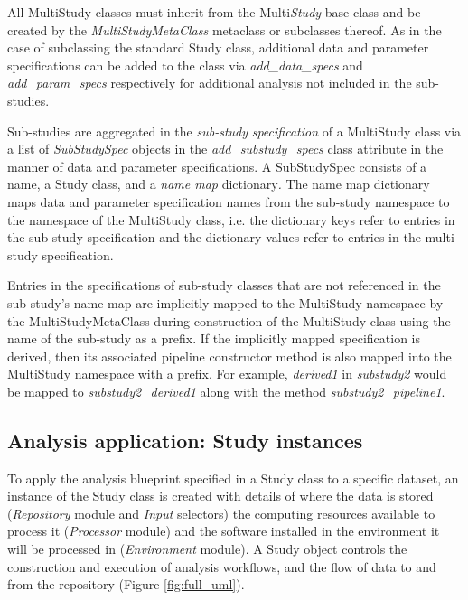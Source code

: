 \documentclass[smallextended]{svjour3}       %
\begin{document}
All MultiStudy classes must inherit from the Multi\emph{Study} base
class and be created by the \emph{MultiStudyMetaClass} metaclass or
subclasses thereof. As in the case of subclassing the standard Study
class, additional data and parameter specifications can be added to the
class via \emph{add\_data\_specs} and \emph{add\_param\_specs}
respectively for additional analysis not included in the sub-studies.

Sub-studies are aggregated in the \emph{sub-study} \emph{specification}
of a MultiStudy class via a list of \emph{SubStudySpec} objects
in the \emph{add\_substudy\_specs} class attribute in the manner of
data and parameter specifications. A SubStudySpec consists of a name, a
Study class, and a \emph{name map} dictionary\emph{.} The name map
dictionary maps data and parameter specification names from the
sub-study namespace to the namespace of the MultiStudy class, i.e.
the dictionary keys refer to entries in the sub-study specification and
the dictionary values refer to entries in the multi-study specification.

Entries in the specifications of sub-study classes that are not
referenced in the sub study's name map are implicitly mapped to the
MultiStudy namespace by the MultiStudyMetaClass during construction of the
MultiStudy class using the name of the sub-study as a prefix.
If the implicitly mapped specification is derived, then its associated pipeline
constructor method is also mapped into the MultiStudy namespace with a prefix.
For example, \emph{derived1} in \emph{substudy2} would be mapped to
\emph{substudy2\_derived1} along with the method
\emph{substudy2\_pipeline1}.

\subsection*{Analysis application: Study instances}
\label{analysis-application-study-instances}

To apply the analysis blueprint specified in a Study class to a specific
dataset, an instance of the Study class is created with details of where
the data is stored (\emph{Repository} module and \emph{Input} selectors) the computing
resources available to process it (\emph{Processor} module) and the software
installed in the environment it will be processed in (\emph{Environment} module).
A Study object controls the construction and execution of analysis workflows,
and the flow of data to and from the repository (Figure \ref{fig:full_uml}).
\end{document}
